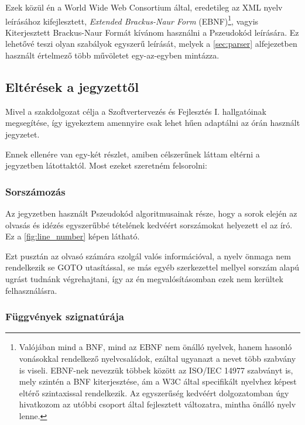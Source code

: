 Ezek közül én a World Wide Web Consortium által, eredetileg az XML nyelv leírásához kifejlesztett\cite{w3c}, \textit{Extended Brackus-Naur Form} (EBNF)\footnote{Valójában mind a BNF, mind az EBNF nem önálló nyelvek, hanem hasonló vonásokkal rendelkező nyelvcsaládok, ezáltal ugyanazt a nevet több szabvány is viseli. EBNF-nek nevezzük többek között az ISO/IEC 14977 szabványt is, mely szintén a BNF kiterjesztése, ám a W3C által specifikált nyelvhez képest eltérő szintaxissal rendelkezik. Az egyszerűség kedvéért dolgozatomban úgy hivatkozom az utóbbi csoport által fejlesztett változatra, mintha önálló nyelv lenne.}, vagyis Kiterjesztett Brackus-Naur Formát kívánom használni a Pszeudokód leírására. Ez lehetővé teszi olyan szabályok egyszerű leírását, melyek a \ref{sec:parser} alfejezetben használt értelmező több művöletet egy-az-egyben mintázza.



\subsection{Eltérések a jegyzettől}

Mivel a szakdolgozat célja a Szoftvertervezés és Fejlesztés I. hallgatóinak megsegítése, így igyekeztem amennyire csak lehet hűen adaptálni az órán használt jegyzetet\cite{jegyzet}.

Ennek ellenére van egy-két részlet, amiben célszerűnek láttam eltérni a jegyzetben látottaktól. Most ezeket szeretném felsorolni:

\subsubsection{Sorszámozás}

Az jegyzetben használt Pszeudokód algoritmusainak része, hogy a sorok elején az olvasás és idézés egyszerűbbé tételének kedvéért sorszámokat helyezett el az író. Ez a \ref{fig:line_number} képen látható.


Ezt pusztán az olvasó számára szolgál valós információval, a nyelv önmaga nem rendelkezik se GOTO utasítással, se más egyéb szerkezettel mellyel sorszám alapú ugrást tudnánk végrehajtani, így az én megvalósításomban ezek nem kerültek felhasználásra.

\subsubsection{Függvények szignatúrája}

